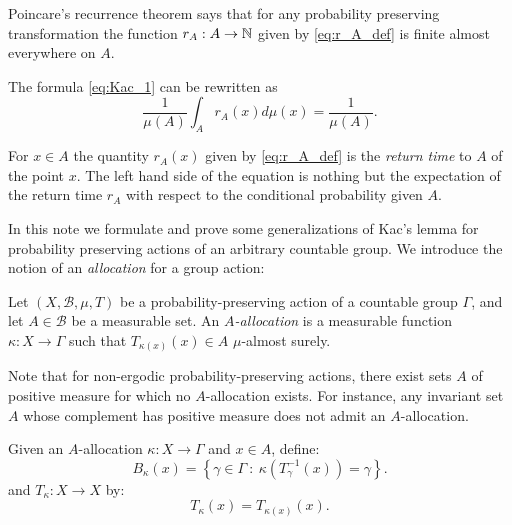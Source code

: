 \documentclass[12pt,reqno]{amsart}
\begin{document}
Poincare's recurrence theorem says that for any probability preserving transformation the function $r_A:A \to \mathbb{N}$ given by \eqref{eq:r_A_def} is  finite almost everywhere on $A$.

The formula \eqref{eq:Kac_1} can be rewritten as 
\[
\frac{1}{\mu(A)}\int_A r_A(x) d\mu(x) = \frac{1}{\mu(A)}.
\]

For $x \in A$ the quantity $r_A(x)$ given by 
\eqref{eq:r_A_def} is the \emph{return time} to $A$ of the point $x$.
The left hand side of the equation is nothing but the expectation of the return time $r_A$ with respect to the conditional probability given $A$.



In this note we formulate and prove some generalizations of Kac's lemma for probability preserving actions of an arbitrary countable group.
We introduce the notion of an \emph{allocation} for a group action:

\begin{definition}\label{def:A_allocation}
Let $(X,\mathcal{B},\mu,T)$ be a  probability-preserving action of a countable group $\Gamma$, and let $A \in \mathcal{B}$ be a measurable set.  An \emph{$A$-allocation} is a measurable function $\kappa:X \to \Gamma$ such that $T_{\kappa(x)}(x) \in A$ $\mu$-almost surely. 

Note that for non-ergodic  probability-preserving actions, there exist sets $A$ of positive measure for which no $A$-allocation exists. For instance, any invariant set $A$ whose complement has positive measure does not admit an $A$-allocation.

Given an $A$-allocation $\kappa:X \to \Gamma$ and $x \in A$, define:
\begin{equation}\label{eq:B_kappa_def}
    B_\kappa(x) = \left\{ \gamma \in \Gamma~:~ \kappa(T_\gamma^{-1}(x))=\gamma \right\}.
\end{equation}
and $T_\kappa:X \to X$ by:
\[
T_\kappa(x) = T_{\kappa(x)}(x).
\]
\end{definition}
\end{document}
